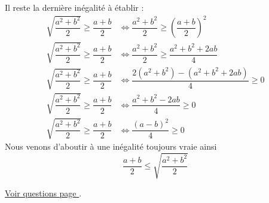 \begin{enumerate}[label=C\arabic*)]
		Il reste la dernière inégalité à établir : 
		\begin{align*}
			\sqrt{\dfrac{a^2+b^2}{2}} \geq \dfrac{a+b}{2} &\iff \dfrac{a^2+b^2}{2} \geq \left(\dfrac{a+b}{2}\right)^2 \\
			\sqrt{\dfrac{a^2+b^2}{2}} \geq \dfrac{a+b}{2} &\iff \dfrac{a^2+b^2}{2} \geq \dfrac{a^2+b^2 + 2ab}{4} \\
			\sqrt{\dfrac{a^2+b^2}{2}} \geq \dfrac{a+b}{2} &\iff \dfrac{2(a^2+b^2) - (a^2+b^2 + 2ab)}{4} \geq 0 \\
			\sqrt{\dfrac{a^2+b^2}{2}} \geq \dfrac{a+b}{2} &\iff \dfrac{a^2 + b^2 - 2ab}{4} \geq 0 \\
			\sqrt{\dfrac{a^2+b^2}{2}} \geq \dfrac{a+b}{2} &\iff \dfrac{(a - b)^2}{4} \geq 0 
		\end{align*}
		Nous venons d'aboutir à une inégalité toujours vraie ainsi 
		\[\boxed{\dfrac{a + b}{2}\leq \sqrt{\dfrac{a^2+b^2}{2}}}\]
		
\end{enumerate}


\hyperref[geom:niveau20]{Voir questions page \pageref{geom:niveau20}}.

\newpage

